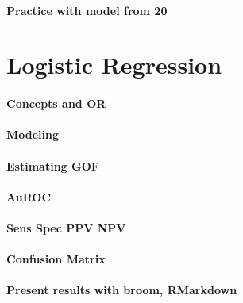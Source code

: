 \documentclass[]{book}
\theoremstyle{definition}
\theoremstyle{definition}
\theoremstyle{definition}
\theoremstyle{remark}
\begin{document}
\hypertarget{practice-with-model-from-20}{%
\subsubsection{Practice with model from
20}\label{practice-with-model-from-20}}

\hypertarget{logistic-regression}{%
\chapter{Logistic Regression}\label{logistic-regression}}

\hypertarget{concepts-and-or}{%
\subsubsection{Concepts and OR}\label{concepts-and-or}}

\hypertarget{modeling}{%
\subsubsection{Modeling}\label{modeling}}

\hypertarget{estimating-gof}{%
\subsubsection{Estimating GOF}\label{estimating-gof}}

\hypertarget{auroc}{%
\subsubsection{AuROC}\label{auroc}}

\hypertarget{sens-spec-ppv-npv}{%
\subsubsection{Sens Spec PPV NPV}\label{sens-spec-ppv-npv}}

\hypertarget{confusion-matrix}{%
\subsubsection{Confusion Matrix}\label{confusion-matrix}}

\hypertarget{present-results-with-broom-rmarkdown}{%
\subsubsection{Present results with broom,
RMarkdown}\label{present-results-with-broom-rmarkdown}}
\end{document}
